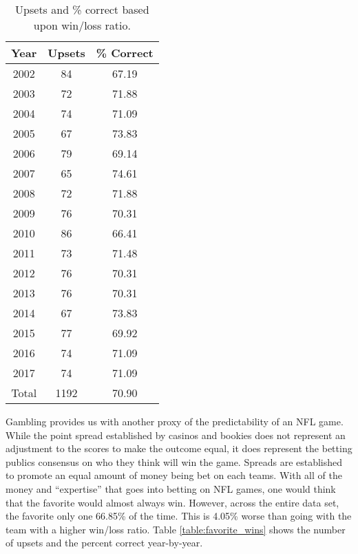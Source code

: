 \documentclass[11pt]{article}
\begin{document}
\begin{table}[!htb]
\begin{center}
\scriptsize
\begin{tabular}{|c|c|c|}
\hline
Year & Upsets & \% Correct\\
\hline
2002 & 84 & 67.19\\
2003 & 72 & 71.88\\
2004 & 74 & 71.09\\
2005 & 67 & 73.83\\
2006 & 79 & 69.14\\
2007 & 65 & 74.61\\
2008 & 72 & 71.88\\
2009 & 76 & 70.31\\
2010 & 86 & 66.41\\
2011 & 73 & 71.48\\
2012 & 76 & 70.31\\
2013 & 76 & 70.31\\
2014 & 67 & 73.83\\
2015 & 77 & 69.92\\
2016 & 74 & 71.09\\
2017 & 74 & 71.09\\
\hline
Total & 1192 & 70.90\\
\hline
\end{tabular}
\caption{Upsets and \% correct based upon win/loss ratio.}\label{table:win_loss_upsets}
\end{center}
\end{table}

Gambling provides us with another proxy of the predictability of an NFL game. While the point spread established by casinos and bookies does not represent an adjustment to the scores to make the outcome equal, it does represent the betting publics consensus on who they think will win the game. Spreads are established to promote an equal amount of money being bet on each teams. With all of the money and ``expertise'' that goes into betting on NFL games, one would think that the favorite would almost always win. However, across the entire data set, the favorite only one 66.85\% of the time. This is 4.05\% worse than going with the team with a higher win/loss ratio. Table \ref{table:favorite_wins} shows the number of upsets and the percent correct year-by-year.
\end{document}
